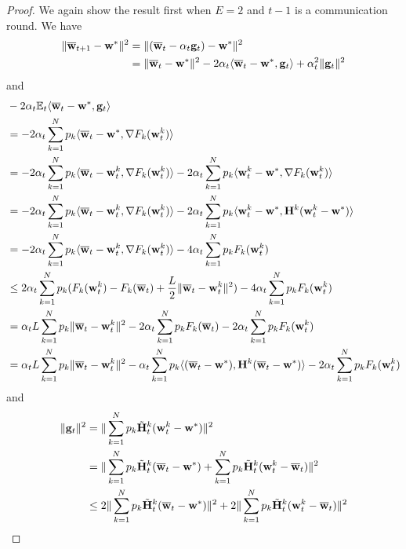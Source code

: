 \begin{proof}
	We again show the result first when $E=2$ and $t-1$ is a communication
	round. We have 
	\begin{align*}
	\|{\overline{\mathbf{w}}}_{t+1}-{\mathbf{w}}^{\ast}\|^{2} & =\|({\overline{\mathbf{w}}}_{t}-\alpha_{t}{\mathbf{g}}_{t})-{\mathbf{w}}^{\ast}\|^{2}\\
	& =\|{\overline{\mathbf{w}}}_{t}-{\mathbf{w}}^{\ast}\|^{2}-2\alpha_{t}\langle{\overline{\mathbf{w}}}_{t}-{\mathbf{w}}^{\ast},{\mathbf{g}}_{t}\rangle+\alpha_{t}^{2}\|{\mathbf{g}}_{t}\|^{2}
	\end{align*}
	and 
	\begin{align*}
	& -2\alpha_{t}\mathbb{E}_{t}\langle{\overline{\mathbf{w}}}_{t}-{\mathbf{w}}^{\ast},{\mathbf{g}}_{t}\rangle\\
	& =-2\alpha_{t}\sum_{k=1}^{N}p_{k}\langle{\overline{\mathbf{w}}}_{t}-{\mathbf{w}}^{\ast},\nabla F_{k}({\mathbf{w}}_{t}^{k})\rangle\\
	& =-2\alpha_{t}\sum_{k=1}^{N}p_{k}\langle{\overline{\mathbf{w}}}_{t}-{\mathbf{w}}_{t}^{k},\nabla F_{k}({\mathbf{w}}_{t}^{k})\rangle-2\alpha_{t}\sum_{k=1}^{N}p_{k}\langle {\mathbf{w}}_{t}^{k}-{\mathbf{w}}^{\ast},\nabla F_{k}({\mathbf{w}}_{t}^{k})\rangle\\
	& =-2\alpha_{t}\sum_{k=1}^{N}p_{k}\langle{\overline{\mathbf{w}}}_{t}-{\mathbf{w}}_{t}^{k},\nabla F_{k}({\mathbf{w}}_{t}^{k})\rangle-2\alpha_{t}\sum_{k=1}^{N}p_{k}\langle {\mathbf{w}}_{t}^{k}-{\mathbf{w}}^{\ast},{\mathbf{H}}^{k}({\mathbf{w}}_{t}^{k}-{\mathbf{w}}^{\ast})\rangle\\
	& =-2\alpha_{t}\sum_{k=1}^{N}p_{k}\langle{\overline{\mathbf{w}}}_{t}-{\mathbf{w}}_{t}^{k},\nabla F_{k}({\mathbf{w}}_{t}^{k})\rangle-4\alpha_{t}\sum_{k=1}^{N}p_{k}F_{k}({\mathbf{w}}_{t}^{k})\\
	& \leq2\alpha_{t}\sum_{k=1}^{N}p_{k}(F_{k}({\mathbf{w}}_{t}^{k})-F_{k}({\overline{\mathbf{w}}}_{t})+\frac{L}{2}\|{\overline{\mathbf{w}}}_{t}-{\mathbf{w}}_{t}^{k}\|^{2})-4\alpha_{t}\sum_{k=1}^{N}p_{k}F_{k}({\mathbf{w}}_{t}^{k})\\
	& =\alpha_{t}L\sum_{k=1}^{N}p_{k}\|{\overline{\mathbf{w}}}_{t}-{\mathbf{w}}_{t}^{k}\|^{2}-2\alpha_{t}\sum_{k=1}^{N}p_{k}F_{k}({\overline{\mathbf{w}}}_{t})-2\alpha_{t}\sum_{k=1}^{N}p_{k}F_{k}({\mathbf{w}}_{t}^{k})\\
	& =\alpha_{t}L\sum_{k=1}^{N}p_{k}\|{\overline{\mathbf{w}}}_{t}-{\mathbf{w}}_{t}^{k}\|^{2}-\alpha_{t}\sum_{k=1}^{N}p_{k}\langle({\overline{\mathbf{w}}}_{t}-{\mathbf{w}}^{\ast}),{\mathbf{H}}^{k}({\overline{\mathbf{w}}}_{t}-{\mathbf{w}}^{\ast})\rangle-2\alpha_{t}\sum_{k=1}^{N}p_{k}F_{k}({\mathbf{w}}_{t}^{k})
	\end{align*}
	and 
	\begin{align*}
	\|\vg_{t}\|^{2} & =\|\sum_{k=1}^{N}p_{k}\tilde{\vH}_{t}^{k}(\vw_{t}^{k}-\vw^{\ast})\|^{2}\\
	& =\|\sum_{k=1}^{N}p_{k}\tilde{\vH}_{t}^{k}(\ov{w}_{t}-\vw^{\ast})+\sum_{k=1}^{N}p_{k}\tilde{\vH}_{t}^{k}(\vw_{t}^{k}-\ov{w}_{t})\|^{2}\\
	& \leq2\|\sum_{k=1}^{N}p_{k}\tilde{\vH}_{t}^{k}(\ov{w}_{t}-\vw^{\ast})\|^{2}+2\|\sum_{k=1}^{N}p_{k}\tilde{\vH}_{t}^{k}(\vw_{t}^{k}-\ov{w}_{t})\|^{2}

\end{align*}
\end{proof}

